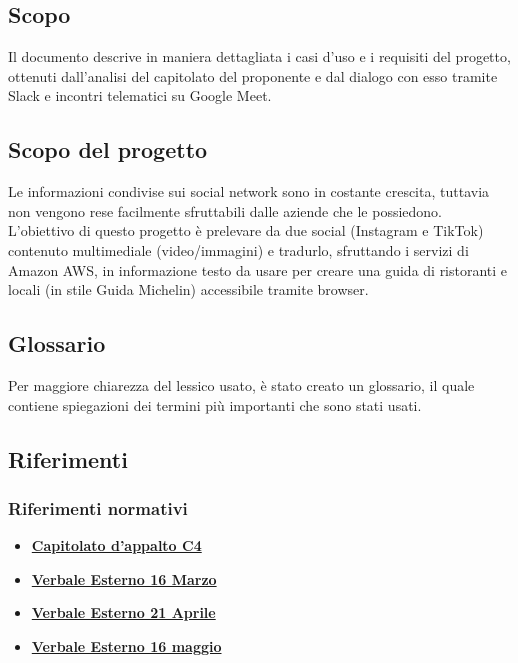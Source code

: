 \subsection{Scopo}
Il documento descrive in maniera dettagliata i casi d'uso e i requisiti del progetto, 
ottenuti dall'analisi del capitolato del proponente \proponente{} e dal dialogo con esso tramite Slack e incontri telematici su Google Meet.

\subsection{Scopo del progetto}
Le informazioni condivise sui social network sono in costante crescita, tuttavia 
non vengono rese facilmente sfruttabili dalle aziende che le possiedono. 
L'obiettivo di questo progetto è prelevare da due social (Instagram e TikTok) 
contenuto multimediale (video/immagini) e tradurlo, sfruttando i servizi di Amazon AWS, in informazione testo da usare per creare una guida di ristoranti e locali
(in stile Guida Michelin) accessibile tramite browser. 

\subsection{Glossario}
Per maggiore chiarezza del lessico usato, è stato creato un glossario, il quale 
contiene spiegazioni dei termini più importanti che sono stati usati.

\subsection{Riferimenti}
\subsubsection{Riferimenti normativi}
\begin{itemize}
	\item
	\href{https://www.math.unipd.it/~tullio/IS-1/2021/Progetto/C4.pdf}{\textbf{Capitolato d'appalto C4}}
    \item
    \href{https://github.com/Bug-s-Bunny-Team/docs/blob/dev/src/Esterni/Verbali/ve_20220316.tex}{\textbf{Verbale Esterno 16 Marzo}}
    \item
	\href{https://github.com/Bug-s-Bunny-Team/docs/blob/dev/src/Esterni/Verbali/ve_20220421.tex}{\textbf{Verbale Esterno 21 Aprile}}
    \item
	\href{https://github.com/Bug-s-Bunny-Team/docs/blob/dev/src/Esterni/Verbali/ve_20220516.tex}{\textbf{Verbale Esterno 16 maggio}}

\end{itemize}
